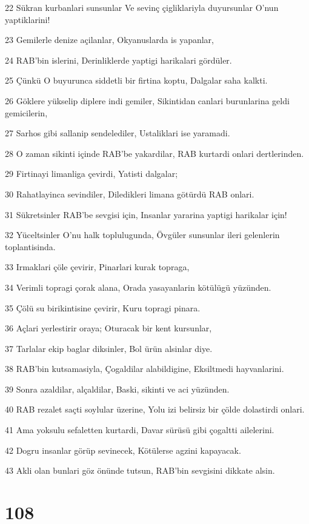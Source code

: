 \par 22 Sükran kurbanlari sunsunlar Ve sevinç çigliklariyla duyursunlar O'nun yaptiklarini!
\par 23 Gemilerle denize açilanlar, Okyanuslarda is yapanlar,
\par 24 RAB'bin islerini, Derinliklerde yaptigi harikalari gördüler.
\par 25 Çünkü O buyurunca siddetli bir firtina koptu, Dalgalar saha kalkti.
\par 26 Göklere yükselip diplere indi gemiler, Sikintidan canlari burunlarina geldi gemicilerin,
\par 27 Sarhos gibi sallanip sendelediler, Ustaliklari ise yaramadi.
\par 28 O zaman sikinti içinde RAB'be yakardilar, RAB kurtardi onlari dertlerinden.
\par 29 Firtinayi limanliga çevirdi, Yatisti dalgalar;
\par 30 Rahatlayinca sevindiler, Diledikleri limana götürdü RAB onlari.
\par 31 Sükretsinler RAB'be sevgisi için, Insanlar yararina yaptigi harikalar için!
\par 32 Yüceltsinler O'nu halk toplulugunda, Övgüler sunsunlar ileri gelenlerin toplantisinda.
\par 33 Irmaklari çöle çevirir, Pinarlari kurak topraga,
\par 34 Verimli topragi çorak alana, Orada yasayanlarin kötülügü yüzünden.
\par 35 Çölü su birikintisine çevirir, Kuru topragi pinara.
\par 36 Açlari yerlestirir oraya; Oturacak bir kent kursunlar,
\par 37 Tarlalar ekip baglar diksinler, Bol ürün alsinlar diye.
\par 38 RAB'bin kutsamasiyla, Çogaldilar alabildigine, Eksiltmedi hayvanlarini.
\par 39 Sonra azaldilar, alçaldilar, Baski, sikinti ve aci yüzünden.
\par 40 RAB rezalet saçti soylular üzerine, Yolu izi belirsiz bir çölde dolastirdi onlari.
\par 41 Ama yoksulu sefaletten kurtardi, Davar sürüsü gibi çogaltti ailelerini.
\par 42 Dogru insanlar görüp sevinecek, Kötülerse agzini kapayacak.
\par 43 Akli olan bunlari göz önünde tutsun, RAB'bin sevgisini dikkate alsin.

\chapter{108}

